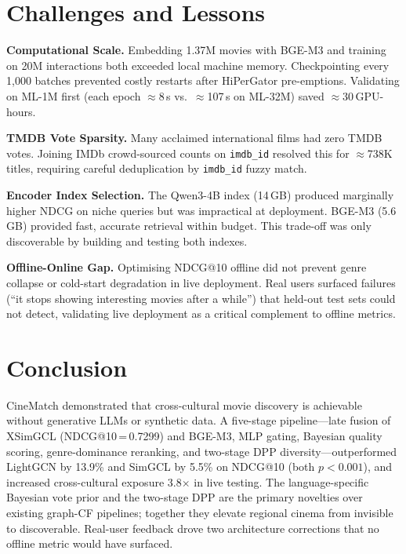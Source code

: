 \documentclass[conference]{IEEEtran}
\begin{document}
\section{Challenges and Lessons}
\label{sec:challenges}

\textbf{Computational Scale.}
Embedding 1.37M movies with BGE-M3 and training on 20M interactions
both exceeded local machine memory.
Checkpointing every 1,000 batches prevented costly restarts after
HiPerGator pre-emptions.
Validating on ML-1M first (each epoch $\approx$8\,s vs.\ $\approx$107\,s
on ML-32M) saved $\approx$30\,GPU-hours.

\textbf{TMDB Vote Sparsity.}
Many acclaimed international films had zero TMDB votes.
Joining IMDb crowd-sourced counts on \texttt{imdb\_id} resolved this
for $\approx$738K titles, requiring careful deduplication by
\texttt{imdb\_id} fuzzy match.

\textbf{Encoder Index Selection.}
The Qwen3-4B index (14\,GB) produced marginally higher NDCG on niche
queries but was impractical at deployment.
BGE-M3 (5.6\,GB) provided fast, accurate retrieval within budget.
This trade-off was only discoverable by building and testing both indexes.

\textbf{Offline-Online Gap.}
Optimising NDCG@10 offline did not prevent genre collapse or cold-start
degradation in live deployment.
Real users surfaced failures (``it stops showing interesting movies
after a while'') that held-out test sets could not detect, validating
live deployment as a critical complement to offline metrics.

\section{Conclusion}
\label{sec:conclusion}

CineMatch demonstrated that cross-cultural movie discovery is achievable
without generative LLMs or synthetic data.
A five-stage pipeline---late fusion of XSimGCL (NDCG@10\,=\,0.7299) and
BGE-M3, MLP gating, Bayesian quality scoring, genre-dominance reranking,
and two-stage DPP diversity---outperformed LightGCN by 13.9\% and
SimGCL by 5.5\% on NDCG@10 (both $p<0.001$), and increased
cross-cultural exposure 3.8$\times$ in live testing.
The language-specific Bayesian vote prior and the two-stage DPP
are the primary novelties over existing graph-CF pipelines; together
they elevate regional cinema from invisible to discoverable.
Real-user feedback drove two architecture corrections that no offline
metric would have surfaced.
\end{document}
